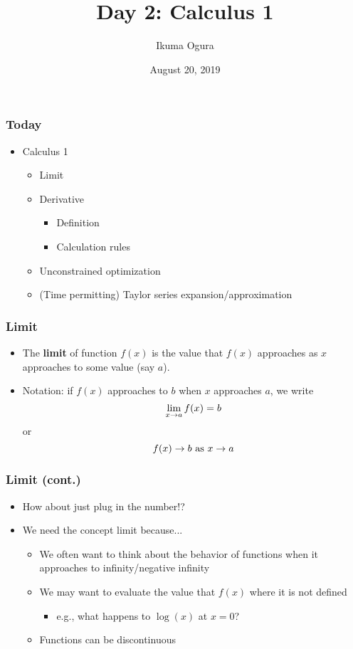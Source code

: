 \documentclass[pdflatex, 12pt]{beamer}
\title[Math Camp]{Day 2: Calculus 1}
\author[Ikuma Ogura]{Ikuma Ogura}
\institute[Georgetown]{Ph.D. student, Department of Government, Georgetown University}
\date[August 20, 2019]{August 20, 2019}
\begin{document}
\begin{frame}
\frametitle{}
\titlepage
\end{frame}

\begin{frame}
\frametitle{Today}
\begin{itemize}
\item Calculus 1
 \begin{itemize}
 \item Limit
 \item Derivative
  \begin{itemize}
  \item Definition
  \item Calculation rules
  \end{itemize}
 \item Unconstrained optimization
 \item (Time permitting) Taylor series expansion/approximation
 \end{itemize}
\end{itemize}
\end{frame}

\begin{frame}
\frametitle{Limit}
\begin{itemize}
\item The \textbf{limit} of function $f(x)$ is the value that $f(x)$ approaches as $x$ approaches to some value (say $a$).
\vspace{0.4cm}
\item Notation: if $f(x)$ approaches to $b$ when $x$ approaches $a$, we write
 \begin{equation}
 \lim_{x \to a} f(x) = b \notag
 \end{equation}
 or
 \begin{equation}
 f(x) \rightarrow b \ \mathrm{as} \ x \rightarrow a \notag
 \end{equation}
\end{itemize}
\end{frame}

\begin{frame}
\frametitle{Limit (cont.)}
\begin{itemize}
\item How about just plug in the number!?
\vspace{0.4cm}
\item We need the concept limit because...
 \begin{itemize}
 \item We often want to think about the behavior of functions when it approaches to infinity/negative infinity
 \item We may want to evaluate the value that $f(x)$ where it is not defined
  \begin{itemize}
  \item e.g., what happens to $\log(x)$ at $x = 0$?
  \end{itemize}
 \item Functions can be discontinuous 
 \end{itemize}
\end{itemize}
\end{frame}
\end{document}
